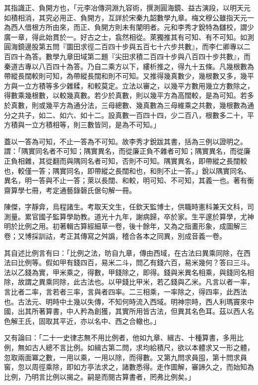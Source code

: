 \begin{pinyinscope}
其指識正、負開方也，「元李冶傳洞淵九容術，撰測圓海鏡、益古演段，以明天元如積相消，其究必用正、負開方，互詳於宋秦九韶數學九章。梅文穆公雖指天元一為西人借根方所由來，而正、負開方則未有闡明者。元和李秀才銳特為讎校，謂少廣一章，得此始貫於一。好古之士，翕然相從。萊獨推其有可知、有不可知。如測圓海鏡邊股第五問『圜田求徑二百四十步與五百七十六步共數』，而李仁卿專以二百四十為答。數學九章田域第二題『尖田求積二百四十步與八百四十步共數』，而秦道古專以八百四十為答。乃自二乘方以下，縷析推之，得九十五條。凡幾根數為帶縱長闊較則可知，為帶縱長闊和則不可知。又推得幾真數少，幾根數又多，幾平方與一立方積等多少雜糅，和較莫定。立法以審之，以幾平方數用幾立方數除之，得數乘幾根數，以較幾真數。若少於真數，則以幾平方為高闊較，是為可知。若多於真數，則或幾平方為通分法，三母總數、幾真數為三母維乘之共數，幾根數為通分之共子，如二、如六、如十二。設真數一百四十四，少二百八，根數多二十，平方積與一立方積相等，則三數皆同，是為不可知。」

蓋以一答為可知，不止一答為不可知。故李秀才銳跋其書，括為三例以證明之。謂：「隅實同名者不可知；隅實異名，而從廉正負不雜者可知；隅實異名，而從廉正負相雜，其從翻而與隅同名者可知，否則不可知。隅實異名，即帶縱之長闊較也，較僅一答；隅實同名，即帶縱之長闊和也，和則不止一答。」銳以隅實同名、異名，明一答與不止一答；萊以長闊、和較，明可知、不可知，其義一也。著有衡齋算學七冊，考定通藝錄磬氏倨句解一冊。

陳傑，字靜弇，烏程諸生。考取天文生，任欽天監博士，供職時憲科兼天文科，司測量。累官國子監算學助教。道光十九年，謝病歸，卒於家。生平邃於算學，尤神明於比例之用。初著輯古算經細草一卷，後十餘年，又為之指畫形象，成圖解三卷；又博採訓詁，考正其傳寫之舛譌，稽合各本之同異，別成音義一卷。

其自述比例言有曰：「比例之法，昉自九章，傳由西域，在古法曰異乘同除，在西法曰比例等。假如甲有錢四百，易米二斗，問乙有錢六百，易米幾何？答曰三斗。法以乙錢為實，甲米乘之，得數，甲錢除之，即得。錢與米異名相乘，與錢同名相除，故謂之異乘同除，此古法也。以甲錢比甲米，若乙錢與乙米。凡言以者一率，言比者二率，言若者三率，言與者四率。二三相乘，一率除之，得四率，此西法也。古法元、明時中土幾以失傳，不知何時流入西域。明神宗時，西人利瑪竇來中國，出其所著算書，中人矜為創獲，其實所用皆古法，但異其名色耳。茲以西人名色解王氏，固取其平近，亦以名中、西之合轍也。」

又有論曰：「二十一史律志無不用比例者，他如九章、緝古、十種算書，多用比例，無如古人總不言比例。如緝古第二問，求均給積尺，欲以本體求又一形之體，忽取兩面冪之數，一用以乘，一用以除，而得數。又第九問求員囤，第十問求員窖，忽以周徑乘除，即如方亭法求之，諸數悉得。走作圖解，審諦久之，而始知為比例，乃明言比例以揭之。嗣是而閱古算書者，罔弗比例矣。」


\end{pinyinscope}
